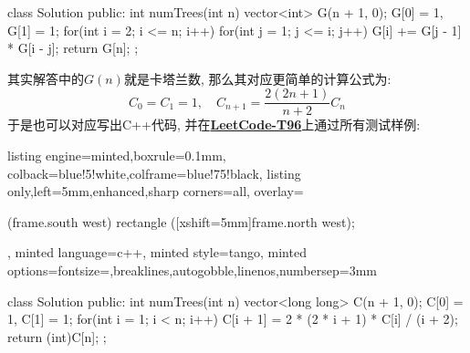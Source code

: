 \documentclass{article}
\begin{document}
\begin{homeworkProblem}
\begin{tcblisting}
class Solution {
public:
    int numTrees(int n) {
        vector<int> G(n + 1, 0);
        G[0] = 1, G[1] = 1;
        for(int i = 2; i <= n; i++) {
            for(int j = 1; j <= i; j++) {
                G[i] += G[j - 1] * G[i - j];
            }
        }
        return G[n];
    }
};
\end{tcblisting}
    \newpage
    其实解答中的$G(n)$就是卡塔兰数, 那么其对应更简单的计算公式为:$$C_0=C_1=1,\quad C_{n+1}=\frac{2\left( 2n+1 \right)}{n+2}C_n
    $$
    于是也可以对应写出C++代码, 并在\href{https://leetcode.cn/problems/unique-binary-search-trees/description/}{\textbf{LeetCode-T96}}上通过所有测试样例:
\begin{tcblisting}{listing engine=minted,boxrule=0.1mm,
colback=blue!5!white,colframe=blue!75!black,
listing only,left=5mm,enhanced,sharp corners=all,
overlay={\begin{tcbclipinterior} (frame.south west)
rectangle ([xshift=5mm]frame.north west);\end{tcbclipinterior}},
minted language=c++,
minted style=tango,
minted options={fontsize=\small,breaklines,autogobble,linenos,numbersep=3mm}}
class Solution {
public:
    int numTrees(int n) {
        vector<long long> C(n + 1, 0);
        C[0] = 1, C[1] = 1;
        for(int i = 1; i < n; i++) {
            C[i + 1] = 2 * (2 * i + 1) * C[i] / (i + 2);
        }
        return (int)C[n];
    }
};
\end{tcblisting}
\end{homeworkProblem}
\end{document}
